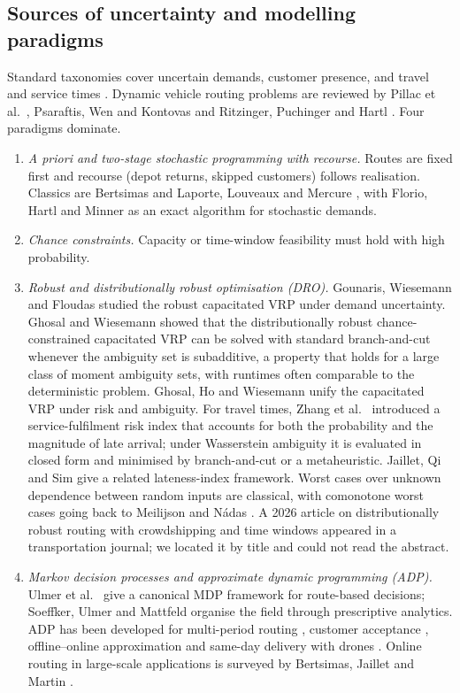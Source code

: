 \documentclass[preprint,12pt]{elsarticle}
\begin{document}
\subsection{Sources of uncertainty and modelling paradigms}

Standard taxonomies cover uncertain demands, customer presence, and travel and service times \cite{Gendreau1996,Gendreau2016,Oyola2018}. Dynamic vehicle routing problems are reviewed by Pillac et al.\ \cite{Pillac2013}, Psaraftis, Wen and Kontovas \cite{Psaraftis2016} and Ritzinger, Puchinger and Hartl \cite{Ritzinger2016}. Four paradigms dominate.

\begin{enumerate}[leftmargin=*]
\item \emph{A priori and two-stage stochastic programming with recourse.} Routes are fixed first and recourse (depot returns, skipped customers) follows realisation. Classics are Bertsimas \cite{Bertsimas1992} and Laporte, Louveaux and Mercure \cite{Laporte1992}, with Florio, Hartl and Minner \cite{Florio2020} as an exact algorithm for stochastic demands.
\item \emph{Chance constraints.} Capacity or time-window feasibility must hold with high probability.
\item \emph{Robust and distributionally robust optimisation (DRO).} Gounaris, Wiesemann and Floudas \cite{Gounaris2013} studied the robust capacitated VRP under demand uncertainty. Ghosal and Wiesemann \cite{GhosalWiesemann2020} showed that the distributionally robust chance-constrained capacitated VRP can be solved with standard branch-and-cut whenever the ambiguity set is subadditive, a property that holds for a large class of moment ambiguity sets, with runtimes often comparable to the deterministic problem. Ghosal, Ho and Wiesemann \cite{GhosalHoWiesemann2024} unify the capacitated VRP under risk and ambiguity. For travel times, Zhang et al.\ \cite{Zhang2021} introduced a service-fulfilment risk index that accounts for both the probability and the magnitude of late arrival; under Wasserstein ambiguity it is evaluated in closed form and minimised by branch-and-cut or a metaheuristic. Jaillet, Qi and Sim \cite{Jaillet2016} give a related lateness-index framework. Worst cases over unknown dependence between random inputs are classical, with comonotone worst cases going back to Meilijson and N{\'a}das \cite{Meilijson1979}. A 2026 article on distributionally robust routing with crowdshipping and time windows \cite{Zhou2026trb} appeared in a transportation journal; we located it by title and could not read the abstract.
\item \emph{Markov decision processes and approximate dynamic programming (ADP).} Ulmer et al.\ \cite{Ulmer2020} give a canonical MDP framework for route-based decisions; Soeffker, Ulmer and Mattfeld \cite{Soeffker2022} organise the field through prescriptive analytics. ADP has been developed for multi-period routing \cite{Ulmer2018}, customer acceptance \cite{UlmerThomas2020}, offline--online approximation \cite{Ulmer2019} and same-day delivery with drones \cite{Chen2022}. Online routing in large-scale applications is surveyed by Bertsimas, Jaillet and Martin \cite{Bertsimas2019}.
\end{enumerate}
\end{document}
